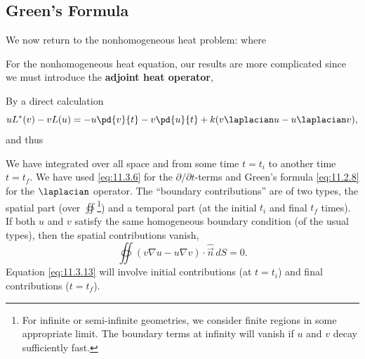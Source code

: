 \subsection{Green's Formula}
\label{subsec:greens-formula-heat}

We now return to the nonhomogeneous heat problem:
where

For the nonhomogeneous heat equation, our results are more complicated since we must introduce the \textbf{adjoint heat operator},

By a direct calculation
\[
uL^*(v) - vL(u) = -u\pd{v}{t} - v\pd{u}{t} + k(v\laplacian u - u\laplacian v),
\]
and thus

We have integrated over all space and from some time $t = t_i$ to another time $t = t_f$.  We have used \eqref{eq:11.3.6} for the $\partial/\partial t$-terms and Green's formula \eqref{eq:11.2.8} for the $\laplacian$ operator.  The ``boundary contributions'' are of two types, the spatial part (over $\oiint$\footnote{For infinite or semi-infinite geometries, we consider finite regions in some appropriate limit.  The boundary terms at infinity will vanish if $u$ and $v$ decay sufficiently fast.}) and a temporal part (at the initial $t_i$ and final $t_f$ times).  If both $u$ and $v$ satisfy the same homogeneous boundary condition (of the usual types), then the spatial contributions vanish,
\[
\oiint (v\nabla u - u\nabla v)\cdot\hat{\vec{n}}\,dS = 0.
\]
Equation \eqref{eq:11.3.13} will involve initial contributions (at $t = t_i$) and final contributions ($t = t_f$).

